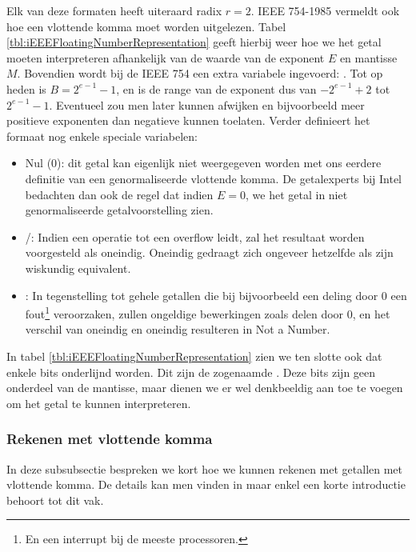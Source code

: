 Elk van deze formaten heeft uiteraard radix $r=2$. IEEE 754-1985 vermeldt ook hoe een vlottende komma moet worden uitgelezen. Tabel \ref{tbl:iEEEFloatingNumberRepresentation} geeft hierbij weer hoe we het getal moeten interpreteren afhankelijk van de waarde van de exponent $E$ en mantisse $M$. Bovendien wordt bij de IEEE 754 een extra variabele ingevoerd: . Tot op heden is $B=2^{e-1}-1$, en is de range van de exponent dus van $-2^{e-1}+2$ tot $2^{e-1}-1$. Eventueel zou men later kunnen afwijken en bijvoorbeeld meer positieve exponenten dan negatieve kunnen toelaten. Verder definieert het formaat nog enkele speciale variabelen:
\begin{itemize}
 \item Nul (0): dit getal kan eigenlijk niet weergegeven worden met ons eerdere definitie van een genormaliseerde vlottende komma. De getalexperts bij Intel bedachten dan ook de regel dat indien $E=0$, we het getal in niet genormaliseerde getalvoorstelling zien.
 \item {}/: Indien een operatie tot een overflow leidt, zal het resultaat worden voorgesteld als oneindig. Oneindig gedraagt zich ongeveer hetzelfde als zijn wiskundig equivalent.
 \item {}: In tegenstelling tot gehele getallen die bij bijvoorbeeld een deling door 0 een fout\footnote{En een interrupt bij de meeste processoren.} veroorzaken, zullen ongeldige bewerkingen zoals delen door 0, en het verschil van oneindig en oneindig resulteren in Not a Number.
\end{itemize}
In tabel \ref{tbl:iEEEFloatingNumberRepresentation} zien we ten slotte ook dat enkele bits onderlijnd worden. Dit zijn de zogenaamde . Deze bits zijn geen onderdeel van de mantisse, maar dienen we er wel denkbeeldig aan toe te voegen om het getal te kunnen interpreteren.
\subsubsection{Rekenen met vlottende komma}
In deze subsubsectie bespreken we kort hoe we kunnen rekenen met getallen met vlottende komma. De details kan men vinden in \cite[\S4]{hyde2004write} maar enkel een korte introductie behoort tot dit vak.
